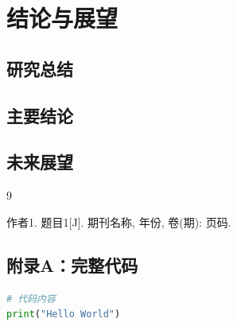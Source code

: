\documentclass{cumcmthesis}
\begin{document}
\section{结论与展望}
\subsection{研究总结}
\subsection{主要结论}
\subsection{未来展望}

\newpage
\begin{thebibliography}{9}
 作者1. 题目1[J]. 期刊名称, 年份, 卷(期): 页码.
\end{thebibliography}

\newpage
\begin{appendices}
\section{附录A：完整代码}
\begin{lstlisting}[language=Python]
# 代码内容
print("Hello World")
\end{lstlisting}
\end{appendices}
\end{document}
